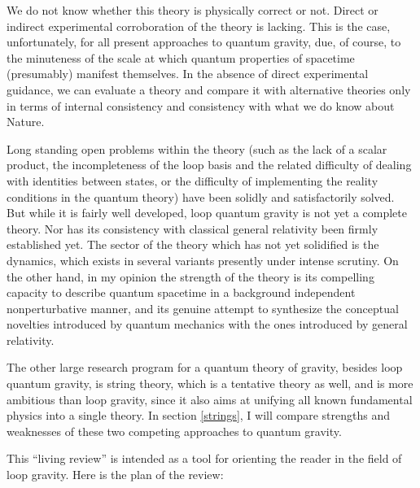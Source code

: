 We do not know whether this theory is physically correct or not.  
Direct or indirect experimental corroboration of the theory is 
lacking.  This is the case, unfortunately, for all present approaches 
to quantum gravity, due, of course, to the minuteness of the scale at 
which quantum properties of spacetime (presumably) manifest 
themselves.  In the absence of direct experimental guidance, we can 
evaluate a theory and compare it with alternative theories only in 
terms of internal consistency and consistency with what we do know 
about Nature.

Long standing open problems within the theory (such as the lack of a 
scalar product, the incompleteness of the loop basis and the related 
difficulty of dealing with identities between states, or the 
difficulty of implementing the reality conditions in the quantum 
theory) have been solidly and satisfactorily solved.  But while it 
is fairly well developed, loop quantum gravity is not yet a complete 
theory.  Nor has its consistency with classical general relativity 
been firmly established yet.  The sector of the theory which has not 
yet solidified is the dynamics, which exists in several variants 
presently under intense scrutiny.  On the other hand, in my opinion the 
strength of the theory is its compelling capacity to describe quantum 
spacetime in a background independent nonperturbative manner, and its 
genuine attempt to synthesize the conceptual novelties introduced by 
quantum mechanics with the ones introduced by general relativity.

The other large research program for a quantum theory of gravity, 
besides loop quantum gravity, is string theory, which is a tentative 
theory as well, and is more ambitious than loop gravity, since it also 
aims at unifying all known fundamental physics into a single theory.  
In section \ref{strings}, I will compare strengths and weaknesses of 
these two competing approaches to quantum gravity.

This ``living review'' is intended as a tool for orienting the 
reader in the field of loop gravity.  Here is the plan of the 
review:

